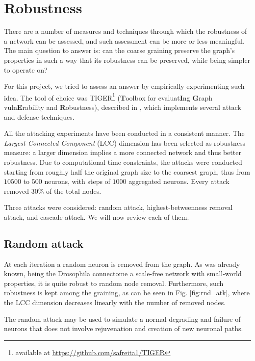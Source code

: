 \section{Robustness}
There are a number of measures and techniques through which the robustness of a network can be assessed, and such assessment can be more or less meaningful. The main question to answer is: can the coarse graining preserve the graph's properties in such a way that its robustness can be preserved, while being simpler to operate on?

For this project, we tried to assess an answer by empirically experimenting such idea. The tool of choice was TIGER\footnote{available at \href{https://github.com/safreita1/TIGER}{https://github.com/safreita1/TIGER}} (\textbf{T}oolbox for evaluat\textbf{I}ng \textbf{G}raph vuln\textbf{E}rability and \textbf{R}obustness), described in \cite{freitas2020tiger}, which implements several attack and defense techniques. 

All the attacking experiments have been conducted in a consistent manner. The \textit{Largest Connected Component} (LCC) dimension has been selected as robustness measure: a larger dimension implies a more connected network and thus better robustness. Due to computational time constraints, the attacks were conducted starting from roughly half the original graph size to the coarsest graph, thus from $10500$ to $500$ neurons, with steps of $1000$ aggregated neurons. Every attack removed 30\% of the total nodes.

Three attacks were considered: random attack, highest-betweenness removal attack, and cascade attack. We will now review each of them.

\subsection{Random attack}
At each iteration a random neuron is removed from the graph. As was already known, being the Drosophila connectome a scale-free network with small-world properties, it is quite robust to random node removal. Furthermore, such robustness is kept among the graining, as can be seen in Fig. \ref{fig:rnd_atk}, where the LCC dimension decreases linearly with the number of removed nodes. 

The random attack may be used to simulate a normal degrading and failure of neurons that does not  involve rejuvenation and creation of new neuronal paths. 

